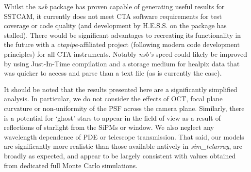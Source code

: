 Whilst the \textit{nsb} package has proven capable of generating useful results for SSTCAM, it currently does not meet CTA software requirements for test coverage or code quality (and development by H.E.S.S. on the package has stalled). There would be significant advantages to recreating its functionality in the future with a \textit{ctapipe}-affiliated project (following modern code development principles) for all CTA instruments. Notably \textit{nsb's} speed could likely be improved by using Just-In-Time compilation and a storage medium for healpix data that was quicker to access and parse than a text file (as is currently the case).

It should be noted that the results presented here are a significantly simplified analysis. In particular, we do not consider the effects of OCT, focal plane curvature or non-uniformity of the PSF across the camera plane. Similarly, there is a potential for `ghost' stars to appear in the field of view as a result of reflections of starlight from the SiPMs or window. We also neglect any wavelength dependence of PDE or telescope transmission. That said, our models are significantly more realistic than those available natively in \textit{sim\_telarray}, are broadly as expected, and appear to be largely consistent with values obtained from dedicated full Monte Carlo simulations.



